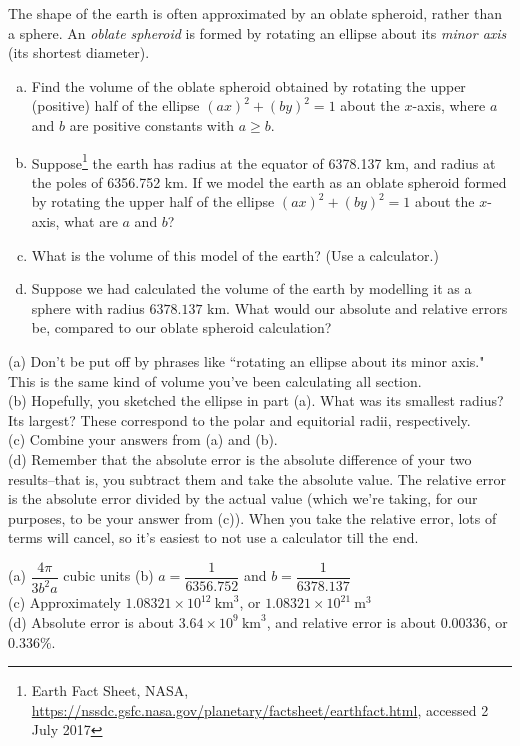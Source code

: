 \begin{question}
The shape of the earth is often approximated by an oblate spheroid, rather than a sphere. An \emph{oblate spheroid} is formed by rotating an ellipse about its \emph{minor axis} (its shortest diameter).
\begin{enumerate}[(a)]
\item Find the volume of the oblate spheroid obtained by rotating the upper (positive) half of the ellipse $(ax)^2+(by)^2=1$ about the $x$-axis, where $a$ and $b$ are positive constants with $a \geq b$.
\item Suppose\footnote{Earth Fact Sheet, NASA, \url{https://nssdc.gsfc.nasa.gov/planetary/factsheet/earthfact.html}, accessed 2 July 2017} the earth has radius at the equator of 6378.137  km, and radius at the poles of 6356.752 km. If we model the earth as an oblate spheroid formed by rotating the upper half of the ellipse $(ax)^2+(by)^2=1$ about the $x$-axis, what are $a$ and $b$?
\item What is the volume of this model of the earth? (Use a calculator.)
\item Suppose we had calculated the volume of the earth by modelling it as a sphere with radius $6378.137$ km. What would our absolute and relative errors be, compared to our oblate spheroid calculation?
\end{enumerate}
\end{question}
\begin{hint}
(a) Don't be put off by phrases like ``rotating an ellipse about its minor axis." This is the same kind of volume you've been calculating all section.\\
(b) Hopefully, you sketched the ellipse in part (a). What was its smallest radius? Its largest? These correspond to the polar and equitorial radii, respectively.\\
(c) Combine your answers from (a) and (b).\\
(d) Remember that the absolute error is the absolute difference of your two results--that is, you subtract them and take the absolute value. The relative error is the absolute error divided by the actual value (which we're taking, for our purposes, to be your answer from (c)). When you take the relative error, lots of terms will cancel, so it's easiest to not use a calculator till the end.
\end{hint}
\begin{answer}
(a) $\dfrac{4\pi}{3b^2a}$ cubic units \qquad
(b) $a = \dfrac{1}{6356.752}$ and $b=\dfrac{1}{6378.137}$\\[5pt]
(c) Approximately $ 1.08321\times 10^{12} ~\mathrm{km}^3$, \quad or \quad
$ 1.08321\times 10^{21}~ \mathrm{m}^3$\\[5pt]
(d) Absolute error is about $3.64\times 10^{9}~ \mathrm{km}^3$, and relative error is about
$0.00336$, or $0.336\%$.
\end{answer}
